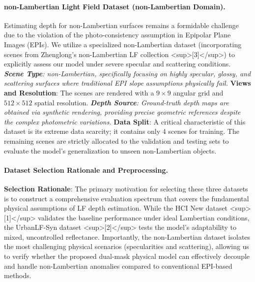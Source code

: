 \paragraph{non-Lambertian Light Field Dataset (non-Lambertian Domain).}
Estimating depth for non-Lambertian surfaces remains a formidable challenge due to the violation of the photo-consistency assumption in Epipolar Plane Images (EPIs). We utilize a specialized non-Lambertian dataset (incorporating scenes from Zhenglong's non-Lambertian LF collection <sup>[3]</sup>) to explicitly assess our model under severe specular and scattering conditions.
\textit{ \textbf{Scene Type}: non-Lambertian, specifically focusing on highly specular, glossy, and scattering surfaces where traditional EPI slope assumptions physically fail.
} \textbf{Views and Resolution}: The scenes are rendered with a $9 \times 9$ angular grid and $512 \times 512$ spatial resolution.
\textit{ \textbf{Depth Source}: Ground-truth depth maps are obtained via synthetic rendering, providing precise geometric references despite the complex photometric variations.
} \textbf{Data Split}: A critical characteristic of this dataset is its extreme data scarcity; it contains only 4 scenes for training. The remaining scenes are strictly allocated to the validation and testing sets to evaluate the model's generalization to unseen non-Lambertian objects.

\paragraph{Dataset Selection Rationale and Preprocessing.}
\textbf{Selection Rationale}: The primary motivation for selecting these three datasets is to construct a comprehensive evaluation spectrum that covers the fundamental physical assumptions of LF depth estimation. While the HCI New dataset <sup>[1]</sup> validates the baseline performance under ideal Lambertian conditions, the UrbanLF-Syn dataset <sup>[2]</sup> tests the model's adaptability to mixed, uncontrolled reflectance. Importantly, the non-Lambertian dataset isolates the most challenging physical scenarios (specularities and scattering), allowing us to verify whether the proposed dual-mask physical model can effectively decouple and handle non-Lambertian anomalies compared to conventional EPI-based methods.

